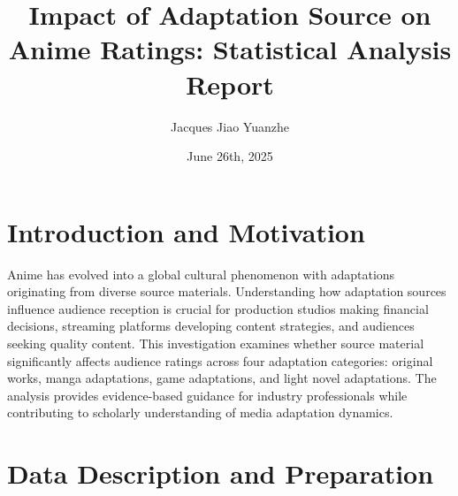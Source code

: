 \documentclass{article}
\title{Impact of Adaptation Source on Anime Ratings: Statistical Analysis Report}
\author{Jacques Jiao Yuanzhe}
\date{June 26th, 2025}
\begin{document}
\maketitle

\section{Introduction and Motivation}
Anime has evolved into a global cultural phenomenon with adaptations originating from diverse source materials. Understanding how adaptation sources influence audience reception is crucial for production studios making financial decisions, streaming platforms developing content strategies, and audiences seeking quality content. This investigation examines whether source material significantly affects audience ratings across four adaptation categories: original works, manga adaptations, game adaptations, and light novel adaptations. The analysis provides evidence-based guidance for industry professionals while contributing to scholarly understanding of media adaptation dynamics.

\section{Data Description and Preparation}
\end{document}
